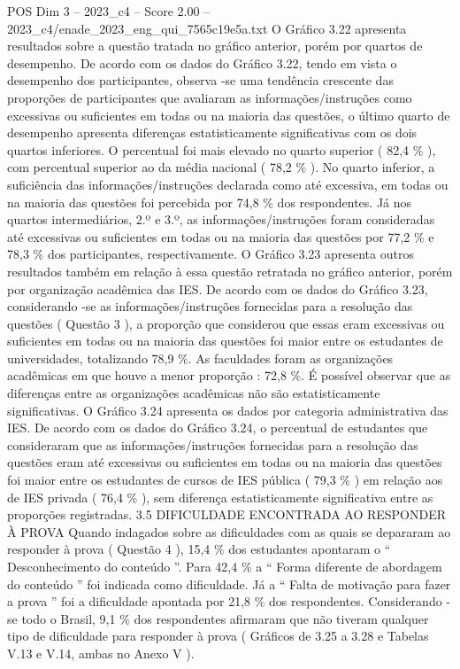 \begin{textsample}{POS Dim 3 – 2023\_c4 – Score 2.00 – 2023\_c4/enade\_2023\_eng\_qui\_7565c19e5a.txt}
O Gráfico 3.22 apresenta resultados sobre a questão tratada no gráfico anterior, porém por quartos de desempenho.
De acordo com os dados do Gráfico 3.22, tendo em vista o desempenho dos participantes, observa -se uma tendência crescente das proporções de participantes que avaliaram as informações/instruções como excessivas ou suficientes em todas ou na maioria das questões, o último quarto de desempenho apresenta diferenças estatisticamente significativas com os dois quartos inferiores.
O percentual foi mais elevado no quarto superior ( 82,4 \% ), com percentual superior ao da média nacional ( 78,2 \% ).
No quarto inferior, a suficiência das informações/instruções declarada como até excessiva, em todas ou na maioria das questões foi percebida por 74,8 \% dos respondentes.
Já nos quartos intermediários, 2.º e 3.º, as informações/instruções foram consideradas até excessivas ou suficientes em todas ou na maioria das questões por 77,2 \% e 78,3 \% dos participantes, respectivamente.
O Gráfico 3.23 apresenta outros resultados também em relação à essa questão retratada no gráfico anterior, porém por organização acadêmica das IES.
De acordo com os dados do Gráfico 3.23, considerando -se as informações/instruções fornecidas para a resolução das questões ( Questão 3 ), a proporção que considerou que essas eram excessivas ou suficientes em todas ou na maioria das questões foi maior entre os estudantes de universidades, totalizando 78,9 \%.
As faculdades foram as organizações acadêmicas em que houve a menor proporção : 72,8 \%.
É possível observar que as diferenças entre as organizações acadêmicas não são estatisticamente significativas.
O Gráfico 3.24 apresenta os dados por categoria administrativa das IES.
De acordo com os dados do Gráfico 3.24, o percentual de estudantes que consideraram que as informações/instruções fornecidas para a resolução das questões eram até excessivas ou suficientes em todas ou na maioria das questões foi maior entre os estudantes de cursos de IES pública ( 79,3 \% ) em relação aos de IES privada ( 76,4 \% ), sem diferença estatisticamente significativa entre as proporções registradas. 3.5 DIFICULDADE ENCONTRADA AO RESPONDER À PROVA Quando indagados sobre as dificuldades com as quais se depararam ao responder à prova ( Questão 4 ), 15,4 \% dos estudantes apontaram o “ Desconhecimento do conteúdo ”.
Para 42,4 \% a “ Forma diferente de abordagem do conteúdo ” foi indicada como dificuldade.
Já a “ Falta de motivação para fazer a prova ” foi a dificuldade apontada por 21,8 \% dos respondentes.
Considerando -se todo o Brasil, 9,1 \% dos respondentes afirmaram que não tiveram qualquer tipo de dificuldade para responder à prova ( Gráficos de 3.25 a 3.28 e Tabelas V.13 e V.14, ambas no Anexo V ).

\end{textsample}

